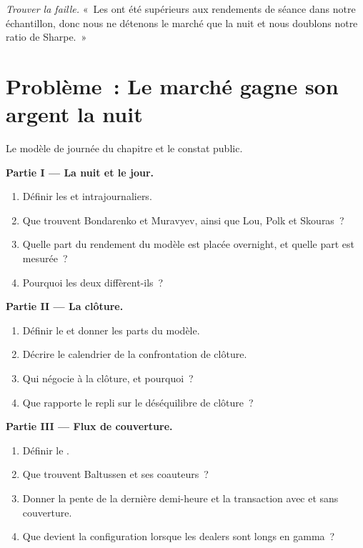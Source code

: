 \begin{exercise}[$\star\star\star$]\label{exo:s1:intraday-patterns:8}
\emph{Trouver la faille.} «~Les  ont été supérieurs aux rendements de séance dans notre échantillon, donc nous ne détenons le marché que la nuit et nous doublons notre
ratio de Sharpe.~»
\end{exercise}

\section{Problème~: Le marché gagne son argent la nuit}

\begin{problem}\label{pb:s1:intraday-patterns:1}
Le modèle de journée du chapitre et le constat public.

\medskip\noindent\textbf{Partie I --- La nuit et le jour.}
\begin{enumerate}
\item Définir les  et intrajournaliers.
\item Que trouvent Bondarenko et Muravyev, ainsi que Lou, Polk et Skouras~?
\item Quelle part du rendement du modèle est placée overnight, et quelle part est mesurée~?
\item Pourquoi les deux diffèrent-ils~?
\end{enumerate}

\medskip\noindent\textbf{Partie II --- La clôture.}
\begin{enumerate}[resume]
\item Définir le  et donner les parts du modèle.
\item Décrire le calendrier de la confrontation de clôture.
\item Qui négocie à la clôture, et pourquoi~?
\item Que rapporte le repli sur le déséquilibre de clôture~?
\end{enumerate}

\medskip\noindent\textbf{Partie III --- Flux de couverture.}
\begin{enumerate}[resume]
\item Définir le .
\item Que trouvent Baltussen et ses coauteurs~?
\item Donner la pente de la dernière demi-heure et la transaction avec et sans couverture.
\item Que devient la configuration lorsque les dealers sont longs en gamma~?
\end{enumerate}


\end{problem}

